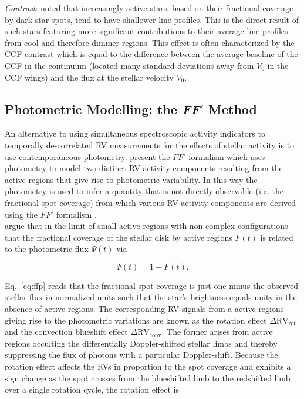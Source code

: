\emph{Contrast}:
\citep{boisse09} noted that increasingly active stars, based on their fractional coverage by dark
star spots, tend to have shallower line profiles. This is the direct result of such stars featuring
more significant contributions to their average line profiles from cool and therefore dimmer regions.
This effect is often characterized by the CCF contrast which is equal to the difference between the
average baseline of the CCF in the continuum (located many standard deviations away from $V_0$ in
the CCF wings) and the flux at the stellar velocity $V_0$.


\subsection{Photometric Modelling: the \textbf{\emph{FF}}$'$ Method} \label{sect:ffp}
An alternative to using simultaneous spectroscopic activity indicators to temporally de-correlated
RV measurements for the effects of stellar activity is to use contemporaneous photometry.
\citep{aigrain12} present the $FF'$ formalism which uses photometry to model two distinct RV activity
components resulting from the active regions that give rise to photometric variability. In this way
the photometry is used to infer a quantity that is not directly observable (i.e. the fractional spot
coverage) from which various RV activity components are derived using the $FF'$ formalism
\citep{rajpaul15}. \\

\cite{aigrain12}
argue that in the limit of small active regions with non-complex configurations that the fractional
coverage of the stellar disk by active regions $F(t)$ is related to the photometric flux
$\Psi(t)$ via

\begin{equation}
  \Psi(t) = 1 - F(t).
  \label{eq:ffp}
\end{equation}

\noindent Eq.~\ref{eq:ffp} reads that the fractional spot coverage is just one minus the observed
stellar flux in normalized units such that the star's brightness equals unity in the absence of active
regions. The corresponding RV signals from a active regions giving rise to the photometric variations
are known
as the rotation effect $\Delta \text{RV}_{\text{rot}}$ and the convection blueshift effect
$\Delta \text{RV}_{\text{conv}}$. The former arises from active regions occulting the differentially
Doppler-shifted stellar limbs and thereby suppressing the flux of photons with a particular
Doppler-shift. Because the rotation effect affects the RVs in proportion to the spot coverage and
exhibits a sign change as the spot crosses from the blueshifted limb to the redshifted limb over a
single rotation cycle, the rotation effect is

